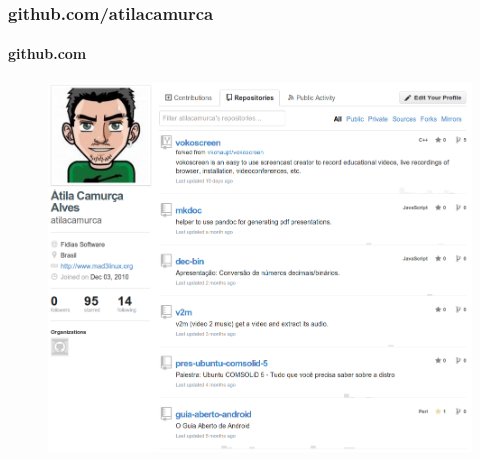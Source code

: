 \begin{frame}\frametitle{github.com/atilacamurca}

\framesubtitle{github.com}

\begin{figure}
    \includegraphics[scale=0.25]{img/github-atilacamurca.png}
\end{figure}

\end{frame}
